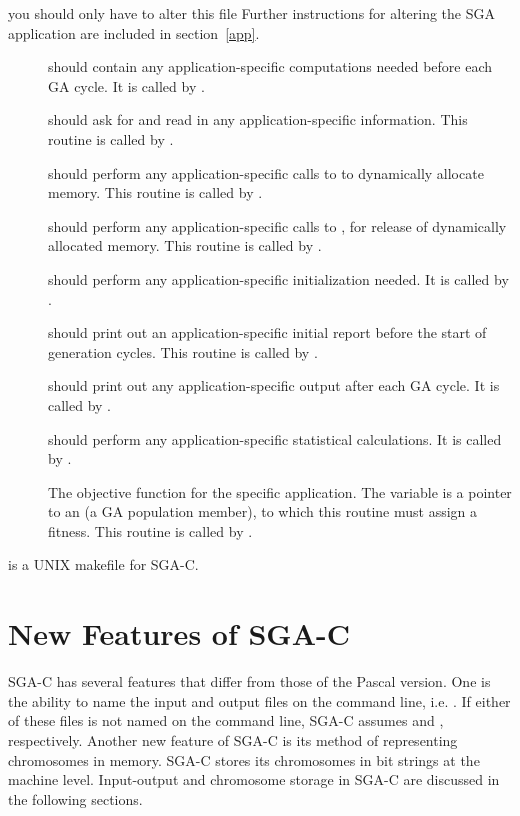 \begin{description}
you should only have to alter this file
Further instructions for altering the SGA application are 
included in section~\ref{app}.
\begin{description}
\item[{}] should contain any application-specific computations
needed before each GA cycle.  It is called by {}.
\item[{}] should ask for and read in any application-specific 
information.  This routine is 
called by {}.
\item[{}] should perform any application-specific calls to 
{} to dynamically allocate memory.  This routine is 
called by {}.
\item[{}]  should perform any application-specific calls to 
{}, for release of dynamically allocated memory.  
This routine is called by {}.
\item[{}] should perform any application-specific initialization
needed.  It is called by {}.
\item[{}] should print out an application-specific initial
report before the start of generation cycles.  This routine is 
called by {}.
\item[{}]  should print out any application-specific  
output 
after each GA cycle.  It is called by {}.
\item[{}]  should perform any application-specific statistical
calculations.  It is called by {}.
\item[{}]  The objective function for the specific application.
The variable {} is a pointer to an {} 
(a GA population member), to which this routine must assign a fitness.
This routine is called by {}.
\end{description}
\item[{\btt{Makefile}}] is a UNIX makefile for SGA-C.  
\end{description}

\section{New Features of SGA-C}
SGA-C has several features that differ from those of the Pascal version.
One is the ability to name the input and output files on the command line, i.e.
{}.  If either of these files is not named on the command line, 
SGA-C assumes 
{} and {}, respectively.  
Another new feature of SGA-C is its method of representing
chromosomes in memory.
SGA-C stores its chromosomes in bit strings at the machine level. 
Input-output and chromosome storage in SGA-C are discussed in the following sections.

